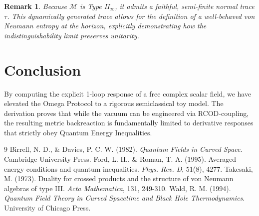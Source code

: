 \documentclass[11pt, a4paper]{article}
\newtheorem{remark}{Remark}
\begin{document}
\begin{remark}
Because $\mathcal{M}$ is Type II$_\infty$, it admits a faithful, semi-finite normal trace $\tau$. This dynamically generated trace allows for the definition of a well-behaved von Neumann entropy at the horizon, explicitly demonstrating how the indistinguishability limit preserves unitarity.
\end{remark}

\section{Conclusion}

By computing the explicit 1-loop response of a free complex scalar field, we have elevated the Omega Protocol to a rigorous semiclassical toy model. The derivation proves that while the vacuum can be engineered via RCOD-coupling, the resulting metric backreaction is fundamentally limited to derivative responses that strictly obey Quantum Energy Inequalities.

\begin{thebibliography}{9}
 Birrell, N. D., \& Davies, P. C. W. (1982). \textit{Quantum Fields in Curved Space}. Cambridge University Press.
 Ford, L. H., \& Roman, T. A. (1995). Averaged energy conditions and quantum inequalities. \textit{Phys. Rev. D}, 51(8), 4277.
 Takesaki, M. (1973). Duality for crossed products and the structure of von Neumann algebras of type III. \textit{Acta Mathematica}, 131, 249-310.
 Wald, R. M. (1994). \textit{Quantum Field Theory in Curved Spacetime and Black Hole Thermodynamics}. University of Chicago Press.
\end{thebibliography}
\end{document}
